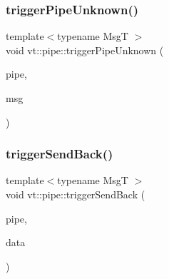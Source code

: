 \mbox{\label{namespacevt_1_1pipe_ae131e6afcc435107fcd51771caa9abc9}} 
\subsubsection{\texorpdfstring{trigger\+Pipe\+Unknown()}{triggerPipeUnknown()}}
{\footnotesize\ttfamily template$<$typename MsgT $>$ \\
void vt\+::pipe\+::trigger\+Pipe\+Unknown (\begin{DoxyParamCaption}\item[{\hyperlink{namespacevt_ac9852acda74d1896f48f406cd72c7bd3}{Pipe\+Type} const \&}]{pipe,  }\item[{MsgT $\ast$}]{msg }\end{DoxyParamCaption})}

\mbox{\label{namespacevt_1_1pipe_aa17c7b2572558dd48295d039f6f26c75}} 
\subsubsection{\texorpdfstring{trigger\+Send\+Back()}{triggerSendBack()}}
{\footnotesize\ttfamily template$<$typename MsgT $>$ \\
void vt\+::pipe\+::trigger\+Send\+Back (\begin{DoxyParamCaption}\item[{\hyperlink{namespacevt_ac9852acda74d1896f48f406cd72c7bd3}{Pipe\+Type} const \&}]{pipe,  }\item[{MsgT $\ast$}]{data }\end{DoxyParamCaption})}

